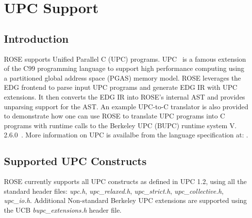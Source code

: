 \chapter{UPC Support}
\label{chap::upcsupport}

\section{Introduction}
ROSE supports Unified Parallel C (UPC) programs.
UPC~\cite{UPC:Web} is a famous extension of the C99 programming language to support high performance computing using a partitioned global address space (PGAS) memory model.
ROSE leverages the EDG frontend to parse input UPC programs and generate EDG IR with UPC extensions.
It then converts the EDG IR into ROSE's internal AST and provides unparsing support for the AST.
An example UPC-to-C translator is also provided to demonstrate how one can use ROSE to 
translate UPC programs into C programs with runtime calls to the Berkeley UPC (BUPC) runtime system V. 2.6.0~\cite{BUPC:Web}.
More information on UPC is availalbe from the language specification at: 
.

\section{Supported UPC Constructs}
ROSE currently supports all UPC constructs as defined in UPC 1.2, using
all the standard header files: {\em upc.h}, {\em upc\_relaxed.h}, {\em upc\_strict.h}, 
{\em upc\_collective.h}, {\em upc\_io.h}. Additional Non-standard Berkeley 
UPC extensions are supported using the UCB {\em bupc\_extensions.h} header file.

